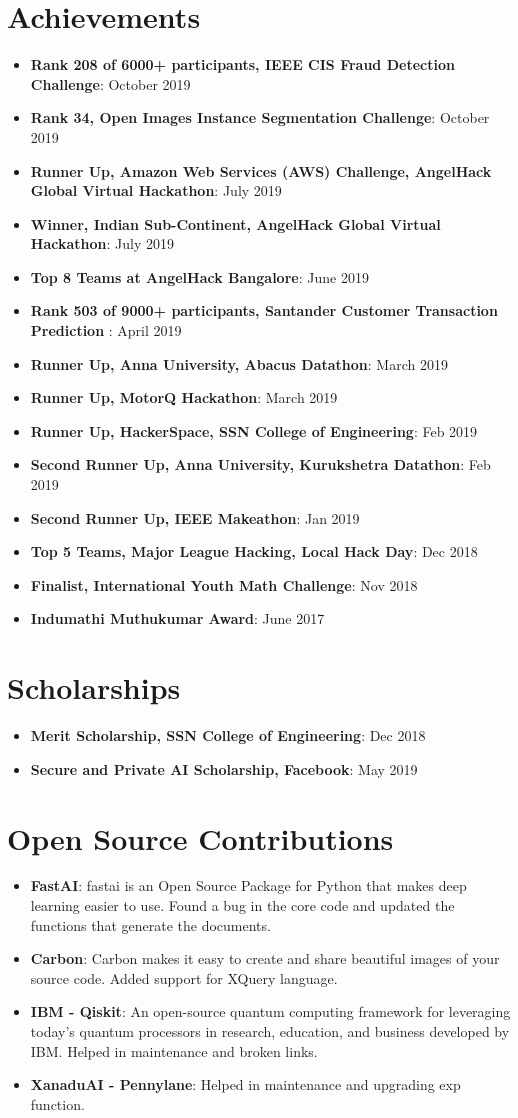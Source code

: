 \documentclass[letterpaper,11pt]{article}
\newcommand{\resumeItem}[2]{
  \item\small{
    \textbf{#1}{: #2 \vspace{-2pt}}
  }
}
\newcommand{\resumeSubItem}[2]{\resumeItem{#1}{#2}\vspace{-4pt}}
\newcommand{\resumeSubHeadingListStart}{\begin{itemize}[leftmargin=*]}
\newcommand{\resumeSubHeadingListEnd}{\end{itemize}}
\begin{document}
\section{Achievements}
  \resumeSubHeadingListStart
           \resumeSubItem
  {Rank 208 of 6000+ participants, IEEE CIS Fraud Detection Challenge}{October 2019}
         \resumeSubItem
  {Rank 34, Open Images Instance Segmentation Challenge}{October 2019}
       \resumeSubItem
  {Runner Up, Amazon Web Services (AWS) Challenge, AngelHack Global Virtual Hackathon}{July 2019}
     \resumeSubItem
  {Winner, Indian Sub-Continent, AngelHack Global Virtual Hackathon}{July 2019}
    \resumeSubItem
  {Top 8 Teams at AngelHack Bangalore}{June 2019}
  \resumeSubItem
  {Rank 503 of 9000+ participants, Santander Customer Transaction Prediction }{April 2019}
    \resumeSubItem
  {Runner Up, Anna University, Abacus Datathon}{March 2019}
    \resumeSubItem
  {Runner Up, MotorQ Hackathon}{March 2019}
     \resumeSubItem
  {Runner Up, HackerSpace, SSN College of Engineering}{Feb 2019}
    \resumeSubItem
  {Second Runner Up, Anna University, Kurukshetra Datathon}{Feb 2019}
  \resumeSubItem
  {Second Runner Up, IEEE Makeathon}{Jan 2019} 	
     \resumeSubItem
      {Top 5 Teams, Major League Hacking, Local Hack Day}{Dec 2018}
  \resumeSubItem
    {Finalist, International Youth Math Challenge}{Nov 2018}
    \resumeSubItem
      {Indumathi Muthukumar Award}{June 2017}
  \resumeSubHeadingListEnd
\section{Scholarships}
  \resumeSubHeadingListStart
      \resumeSubItem
  {Merit Scholarship, SSN College of Engineering}{Dec 2018}
    \resumeSubItem
      {Secure and Private AI Scholarship, Facebook}{May 2019}	
\resumeSubHeadingListEnd
\section{Open Source Contributions}
  \resumeSubHeadingListStart
      \resumeSubItem
  {FastAI}{fastai is an Open Source Package for Python that makes deep learning easier to use. Found a bug in the core code and updated the functions that generate the documents.}
    \resumeSubItem
      {Carbon}{Carbon makes it easy to create and share beautiful images of your source code. Added support for XQuery language.}
  \resumeSubItem
  {IBM - Qiskit}{An open-source quantum computing framework for leveraging today's quantum processors in research, education, and business developed by IBM. Helped in maintenance and broken links.}
    \resumeSubItem
  {XanaduAI - Pennylane}{Helped in maintenance and upgrading exp function.}
\resumeSubHeadingListEnd
\end{document}
